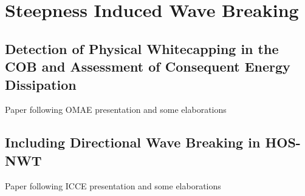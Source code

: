 \chapter{Steepness Induced Wave Breaking}\label{ch:wavebreaking}


\section{Detection of Physical Whitecapping in the COB and Assessment of Consequent Energy Dissipation}
Paper following OMAE presentation and some elaborations

\section{Including Directional Wave Breaking in HOS-NWT}
Paper following ICCE presentation and some elaborations


\cleardoublepage

